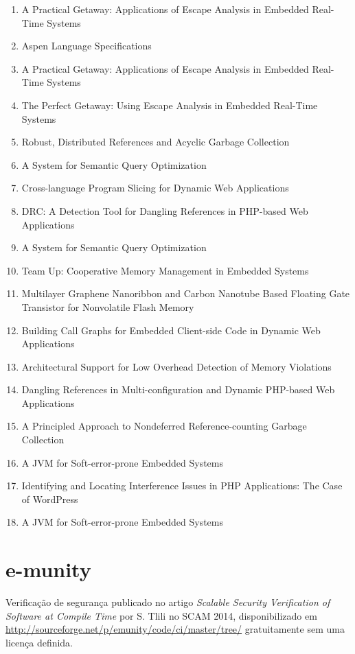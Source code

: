 \begin{enumerate}
\item A Practical Getaway: Applications of Escape Analysis in Embedded Real-Time Systems
\item Aspen Language Specifications
\item A Practical Getaway: Applications of Escape Analysis in Embedded Real-Time Systems
\item The Perfect Getaway: Using Escape Analysis in Embedded Real-Time Systems
\item Robust, Distributed References and Acyclic Garbage Collection
\item A System for Semantic Query Optimization
\item Cross-language Program Slicing for Dynamic Web Applications
\item DRC: A Detection Tool for Dangling References in PHP-based Web Applications
\item A System for Semantic Query Optimization
\item Team Up: Cooperative Memory Management in Embedded Systems
\item Multilayer Graphene Nanoribbon and Carbon Nanotube Based Floating Gate Transistor for Nonvolatile Flash Memory
\item Building Call Graphs for Embedded Client-side Code in Dynamic Web Applications
\item Architectural Support for Low Overhead Detection of Memory Violations
\item Dangling References in Multi-configuration and Dynamic PHP-based Web Applications
\item A Principled Approach to Nondeferred Reference-counting Garbage Collection
\item A JVM for Soft-error-prone Embedded Systems
\item Identifying and Locating Interference Issues in PHP Applications: The Case of WordPress
\item A JVM for Soft-error-prone Embedded Systems
\end{enumerate}

\section{e-munity}

Verificação de segurança
publicado no artigo {\it Scalable Security Verification of Software at Compile Time}
por S. Tlili
no SCAM 2014,
disponibilizado em \url{http://sourceforge.net/p/emunity/code/ci/master/tree/}
gratuitamente
sem uma licença definida.

